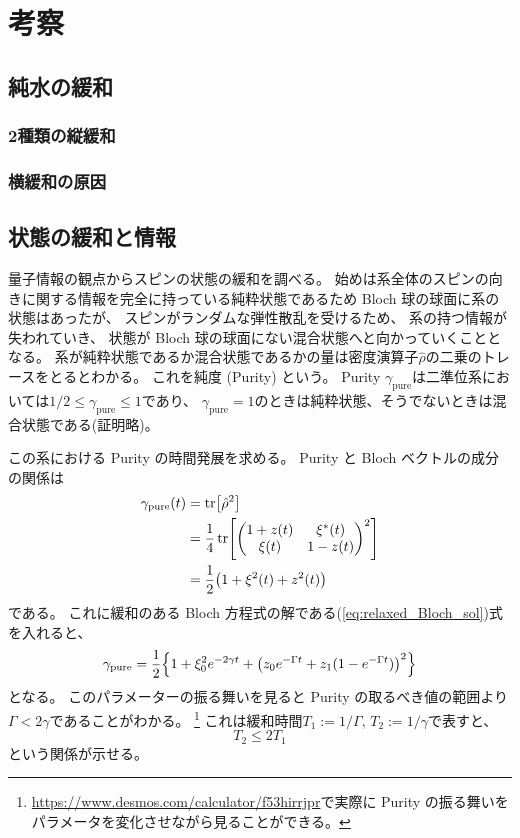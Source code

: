 \documentclass[11pt,dvipdfmx,a4paper]{jsarticle}
\begin{document}
\clearpage

\section{考察}
\subsection{純水の緩和}
\subsubsection*{2種類の縦緩和}
\subsubsection*{横緩和の原因}

\subsection{状態の緩和と情報}

量子情報の観点からスピンの状態の緩和を調べる。
始めは系全体のスピンの向きに関する情報を完全に持っている純粋状態であるため Bloch 球の球面に系の状態はあったが、
スピンがランダムな弾性散乱を受けるため、
系の持つ情報が失われていき、
状態が Bloch 球の球面にない混合状態へと向かっていくこととなる。
系が純粋状態であるか混合状態であるかの量は密度演算子\(\hat{\rho}\)の二乗のトレースをとるとわかる。
これを純度 (Purity) という。
 Purity \(\gamma_{\text{pure}}\)は二準位系においては\(1/2 \leq \gamma_{\text{pure}}\leq 1\)であり、
\(\gamma_{\text{pure}} = 1\)のときは純粋状態、そうでないときは混合状態である(証明略)。

この系における Purity の時間発展を求める。
Purity と Bloch ベクトルの成分の関係は
\begin{align}
	\gamma_{\text{pure}}(t) &= \tr[\hat{\rho}^2] \notag\\
	&=\frac{1}{4}\tr[
		\begin{pmatrix}
			1 + z(t) & \xi^*(t)\\
			\xi(t) & 1 - z(t)
		\end{pmatrix}^2]\notag\\
	&=\frac{1}{2}\qty(1+\xi^2(t)+z^2(t)) \notag\\
\end{align}
である。
これに緩和のある Bloch 方程式の解である(\ref{eq:relaxed_Bloch_sol})式を入れると、
\begin{equation}
	\gamma_{\text{pure}} = \frac{1}{2}\Bigl\{1+\xi_0^2e^{-2\gamma t}+\qty(z_0 e^{-\Gamma t} + z_{1}(1-e^{-\Gamma t}))^2\Bigr\}
\end{equation}
となる。
このパラメーターの振る舞いを見ると Purity の取るべき値の範囲より\(\Gamma < 2\gamma\)であることがわかる。
\footnote{\url{https://www.desmos.com/calculator/f53hirrjpr}で実際に Purity の振る舞いをパラメータを変化させながら見ることができる。}
これは緩和時間\(T_1 := 1/\Gamma,\,T_2 := 1/\gamma\)で表すと、
\begin{equation}
	T_2 \le 2T_1
\end{equation}
という関係が示せる。
\end{document}
